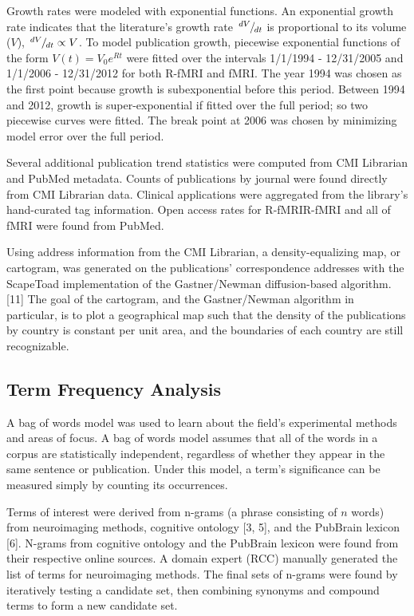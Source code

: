 \documentclass[12pt,3p]{elsarticle}
\def\slantfrac#1#2{\kern.1em^{#1}\kern-.1em/\kern-.1em_{#2}}
\begin{document}
Growth rates were modeled with exponential functions. An exponential growth rate
indicates that the literature’s growth rate $\slantfrac{dV}{dt}$ is proportional to its
volume ($V$), $\slantfrac{dV}{dt} \propto V$.  To model publication growth, piecewise exponential
functions of the form $V(t)=V_0 e^{Rt}$ were fitted over the intervals
1/1/1994 - 12/31/2005 and 1/1/2006 - 12/31/2012 for both
R-fMRI and fMRI. The year 1994 was chosen as the first point because
growth is subexponential before this period. Between 1994 and 2012, growth
is super-exponential if fitted over the full period; so two piecewise curves
were fitted. The break point at 2006 was chosen by minimizing model error over
the full period. 

Several additional publication trend statistics were computed from CMI Librarian
and PubMed metadata. Counts of publications by journal were found directly from
CMI Librarian data. Clinical applications were aggregated from the library’s
hand-curated tag information. Open access rates for R-fMRIR-fMRI and all of
fMRI were found from PubMed. 

Using address information from the CMI Librarian, a density-equalizing map, or
cartogram, was generated on the publications’ correspondence addresses with the
ScapeToad implementation of the Gastner/Newman diffusion-based algorithm. [11]
The goal of the cartogram, and the Gastner/Newman algorithm in particular, is to
plot a geographical map such that the density of the publications by country is
constant per unit area, and the boundaries of each country are still
recognizable.

\subsection{Term Frequency Analysis}
A bag of words model was used to learn about the field’s experimental methods
and areas of focus. A bag of words model assumes that all of the words in a
corpus are statistically independent, regardless of whether they appear in the
same sentence or publication.  Under this model, a term’s significance can be
measured simply by counting its occurrences.

Terms of interest were derived from n-grams (a phrase consisting of $n$ words)
from neuroimaging methods, cognitive ontology [3, 5], and the PubBrain lexicon
[6]. N-grams from cognitive ontology and the PubBrain lexicon were found from
their respective online sources. A domain expert (RCC) manually generated the
list of terms for neuroimaging methods. The final sets of n-grams were found by
iteratively testing a candidate set, then combining synonyms and compound terms
to form a new candidate set.
\end{document}

